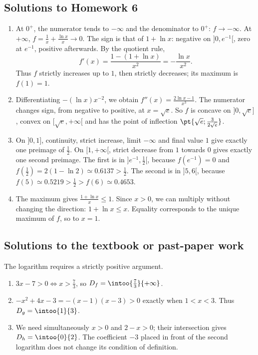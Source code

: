 \subsection{Solutions to Homework 6}\begin{enumerate}
\item At $0^+$, the numerator tends to $-\infty$ and the denominator to $0^+$: $f\to-\infty$. At $+\infty$, $f=\frac{1}{x}+\frac{\ln x}{x}\to0$. The sign is that of $1+\ln x$: negative on $]0,e^{-1}[$, zero at $e^{-1}$, positive afterwards. By the quotient rule,
\[f'(x)=\frac{1-(1+\ln x)}{x^2}=-\frac{\ln x}{x^2}.\]
Thus $f$ strictly increases up to $1$, then strictly decreases; its maximum is $f(1)=1$.
\item Differentiating $-(\ln x)x^{-2}$, we obtain $f''(x)=\frac{2\ln x-1}{x^3}$. The numerator changes sign, from negative to positive, at $x=\sqrt e$. So $f$ is concave on $]0,\sqrt e]$, convex on $[\sqrt e,+\infty[$ and has the point of inflection $\pt{\sqrt{e};\frac{3}{2\sqrt e}}$.
\item On $]0,1]$, continuity, strict increase, limit $-\infty$ and final value $1$ give exactly one preimage of $\frac{1}{2}$. On $[1,+\infty[$, strict decrease from $1$ towards $0$ gives exactly one second preimage. The first is in $]e^{-1},\frac{1}{2}[$, because $f(e^{-1})=0$ and $f(\frac{1}{2})=2(1-\ln2)\simeq\num{0,6137}>\frac{1}{2}$. The second is in $]5,6[$, because $f(5)\simeq\num{0,5219}>\frac{1}{2}>f(6)\simeq\num{0,4653}$.
\item The maximum gives $\frac{1+\ln x}{x}\le1$. Since $x>0$, we can multiply without changing the direction: $1+\ln x\le x$. Equality corresponds to the unique maximum of $f$, so to $x=1$.
\end{enumerate}

\subsection{Solutions to the textbook or past-paper work}The logarithm requires a strictly positive argument.
\begin{enumerate}
\item $3x-7>0\Longleftrightarrow x>\frac73$, so $D_f=\intoo{\frac73}{+\infty}$.
\item $-x^2+4x-3=-(x-1)(x-3)>0$ exactly when $1<x<3$. Thus $D_g=\intoo{1}{3}$.
\item We need simultaneously $x>0$ and $2-x>0$; their intersection gives $D_h=\intoo{0}{2}$. The coefficient $-3$ placed in front of the second logarithm does not change its condition of definition.
\end{enumerate}

\fi

